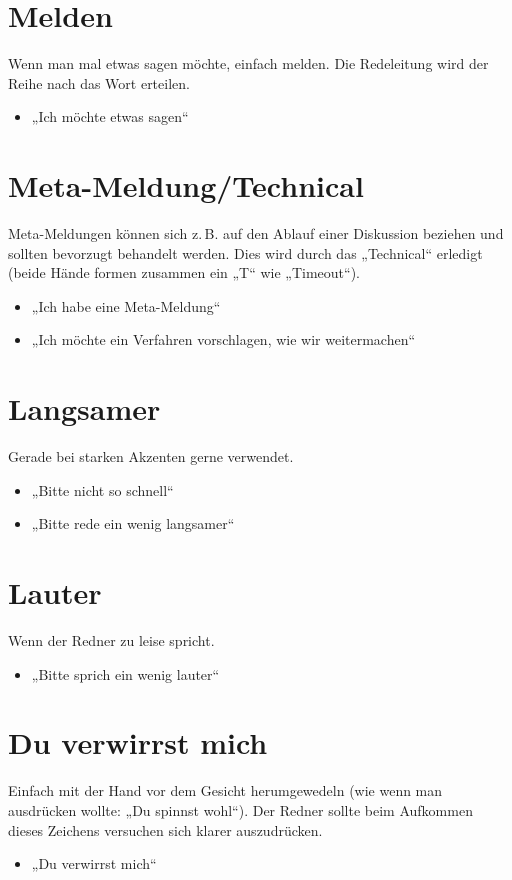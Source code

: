 \section{Melden}
Wenn man mal etwas sagen möchte, einfach melden. Die Redeleitung wird der Reihe
nach das Wort erteilen.
\begin{itemize}
	\item „Ich möchte etwas sagen“
\end{itemize}

\section{Meta-Meldung/Technical}
Meta-Meldungen können sich z.\,B. auf den Ablauf einer Diskussion beziehen und
sollten bevorzugt behandelt werden. Dies wird durch das „Technical“ erledigt
(beide Hände formen zusammen ein „T“ wie „Timeout“).
\begin{itemize}
	\item „Ich habe eine Meta-Meldung“
	\item „Ich möchte ein Verfahren vorschlagen, wie wir weitermachen“
\end{itemize}

\section{Langsamer}
Gerade bei starken Akzenten gerne verwendet.
\begin{itemize}
	\item „Bitte nicht so schnell“
	\item „Bitte rede ein wenig langsamer“
\end{itemize}

\section{Lauter}
Wenn der Redner zu leise spricht.
\begin{itemize}
	\item „Bitte sprich ein wenig lauter“
\end{itemize}

\section{Du verwirrst mich}
Einfach mit der Hand vor dem Gesicht herumgewedeln (wie wenn man ausdrücken
wollte: „Du spinnst wohl“). Der Redner sollte beim Aufkommen dieses Zeichens
versuchen sich klarer auszudrücken.
\begin{itemize}
	\item „Du verwirrst mich“
\end{itemize}

